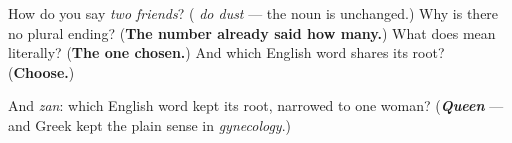 \begin{tcolorbox}[breakable,colback=teal!4,colframe=teal!35!black,title={Before you move on}]
How do you say \emph{two friends}? (\textbf{ } \emph{do dust} — the noun is unchanged.) Why is there no plural ending? (\textbf{The number already said how many.}) What does \textbf{} mean literally? (\textbf{The one chosen.}) And which English word shares its root? (\textbf{Choose.})

And \emph{zan}: which English word kept its root, narrowed to one woman? (\emph{\textbf{Queen}} — and Greek kept the plain sense in \emph{gynecology}.)
\end{tcolorbox}
